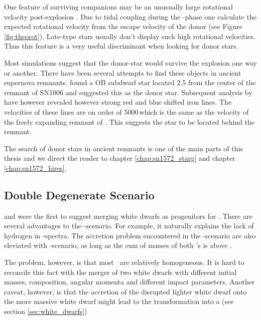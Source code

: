 One feature of surviving companions may be an unusually large rotational velocity post-explosion \citep[][chapter \ref{ch:sn1572_starg} of this work]{2009ApJ...701.1665K}. Due to tidal coupling during the \rlof-phase one calculate the expected rotational velocity from the escape velocity of the donor (see Figure \ref{fig:theorot}). Late-type stars usually don't display such high rotational velocities. Thus this feature is a very useful discriminant when looking for donor stars. 

Most simulations suggest that the donor-star would survive the explosion one way or another. There have been several attempts to find these objects in ancient supernova remnants. \citet{1980ApJ...241.1039S} found a OB subdwarf star located 2.5 \arcmin from the center of the remnant of SN1006 and suggested this as the donor star. Subsequent analysis by \cite{1997ApJ...477L..53W, 1983ApJ...269L...5W} have however revealed however strong red and blue shifted iron lines. The velocities of these lines are on order of 5000\,\kms which is the same as the velocity of the freely expanding remnant of . This suggests the star to be located behind the remnant.
 
The search of donor stars in ancient remnants is one of the main parts of this thesis and we direct the reader to chapter \ref{chap:sn1572_starg} and chapter \ref{chap:sn1572_hires}.



\subsection{Double Degenerate Scenario}
\citet{1984ApJ...277..355W} and \citet{1984ApJS...54..335I} were the first to suggest merging white dwarfs as progenitors for \snia. There are several advantages to the \dd-scenario. For example, it naturally explains the lack of hydrogen in \snia-spectra. The accretion problem encountered in the \sd-scenario are also eleviated with \dd-scenario, as long as the sum of masses of both \cowd's is above \mchan. 

The problem, however, is that most \snia\ are relatively homogeneous. It is hard to reconcile this fact with the merger of two white dwarfs with different initial masses, composition, angular momenta and different impact parameters. Another caveat, however, is that the accretion of the disrupted lighter white dwarf onto the more massive white dwarf might lead to the transformation into a \onemgwd (see section \ref{sec:white_dwarfs})


